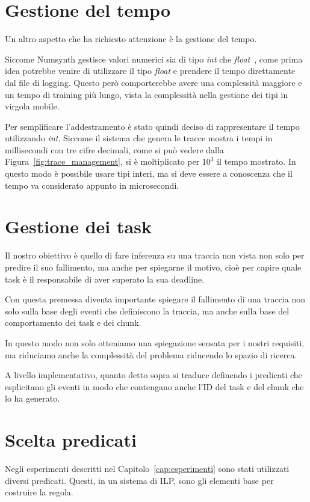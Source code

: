 \section{Gestione del tempo}
Un altro aspetto che ha richiesto attenzione è la gestione del tempo.

Siccome Numsynth gestisce valori numerici sia di tipo \textit{int} che \textit{float}~\cite{numsynth}, come prima idea potrebbe venire di utilizzare il tipo \textit{float} e prendere il tempo direttamente dal file di logging. Questo però comporterebbe avere una complessità maggiore e un tempo di training più lungo, vista la complessità nella gestione dei tipi in virgola mobile.

\myskip

Per semplificare l'addestramento è stato quindi deciso di rappresentare il tempo utilizzando \textit{int}. Siccome il sistema che genera le tracce mostra i tempi in millisecondi con tre cifre decimali, come si può vedere dalla Figura~\ref{fig:trace_management}, si è moltiplicato per $10^3$ il tempo mostrato. In questo modo è possibile usare tipi interi, ma si deve essere a conoscenza che il tempo va considerato appunto in microsecondi.

\section{Gestione dei task}
\label{sec:gestione-task}
Il nostro obiettivo è quello di fare inferenza su una traccia non vista non solo per predire il suo fallimento, ma anche per spiegarne il motivo, cioè per capire quale task è il responsabile di aver superato la sua deadline.

Con questa premessa diventa importante spiegare il fallimento di una traccia non solo sulla base degli eventi che definiscono la traccia, ma anche sulla base del comportamento dei task e dei chunk.

In questo modo non solo otteniamo una spiegazione sensata per i nostri requisiti, ma riduciamo anche la complessità del problema riducendo lo spazio di ricerca.

\myskip

A livello implementativo, quanto detto sopra si traduce definendo i predicati che esplicitano gli eventi in modo che contengano anche l'ID del task e del chunk che lo ha generato.

\section{Scelta predicati}
Negli esperimenti descritti nel Capitolo~\ref{cap:esperimenti} sono stati utilizzati diversi predicati. Questi, in un sistema di ILP, sono gli elementi base per costruire la regola.


